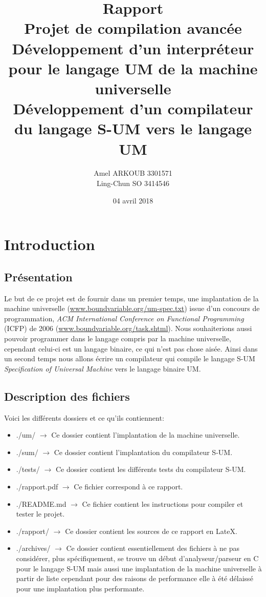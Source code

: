 \documentclass[a4paper,12pt]{report}
\title{\Huge Rapport \\ 
	Projet de compilation avancée \\
	\large Développement d'un interpréteur pour le langage UM de la machine universelle \\
	Développement d'un compilateur du langage S-UM vers le langage UM}
\author{Amel ARKOUB 3301571 \\ Ling-Chun SO 3414546}
\date{04 avril 2018}
\begin{document}
\maketitle

\tableofcontents
\newpage

\chapter{Introduction}
\section{Présentation}
Le but de ce projet est de fournir dans un premier temps, une implantation de la machine universelle (\url{www.boundvariable.org/um-spec.txt})
issue d'un concours de programmation, \textit{ACM International Conference on Functional Programming} (ICFP) de 2006 
(\url{www.boundvariable.org/task.shtml}).
Nous souhaiterions aussi pouvoir programmer dans le langage compris par la machine universelle, cependant celui-ci est un langage
binaire, ce qui n'est pas chose aisée. Ainsi dans un second temps nous allons écrire un compilateur qui compile le langage S-UM 
\textit{Specification of Universal Machine} vers le langage binaire UM.

\section{Description des fichiers}
Voici les différents dossiers et ce qu'ils contiennent:
\begin{itemize}
 \item ./um/ $\rightarrow$ Ce dossier contient l'implantation de la machine universelle.
 \item ./sum/ $\rightarrow$ Ce dossier contient l'implantation du compilateur S-UM.
 \item ./tests/ $\rightarrow$ Ce dossier contient les différents tests du compilateur S-UM.
 \item ./rapport.pdf $\rightarrow$ Ce fichier correspond à ce rapport.
 \item ./README.md $\rightarrow$ Ce fichier contient les instructions pour compiler et tester le projet.
 \item ./rapport/ $\rightarrow$ Ce dossier contient les sources de ce rapport en LateX.
 \item ./archives/ $\rightarrow$ Ce dossier contient essentiellement des fichiers à ne pas considérer, plus spécifiquement, se trouve
 un début d'analyseur/parseur en C pour le langage S-UM mais aussi une implantation de la machine universelle à partir de liste cependant
 pour des raisons de performance elle à été délaissé pour une implantation plus performante.
\end{itemize}
\end{document}
